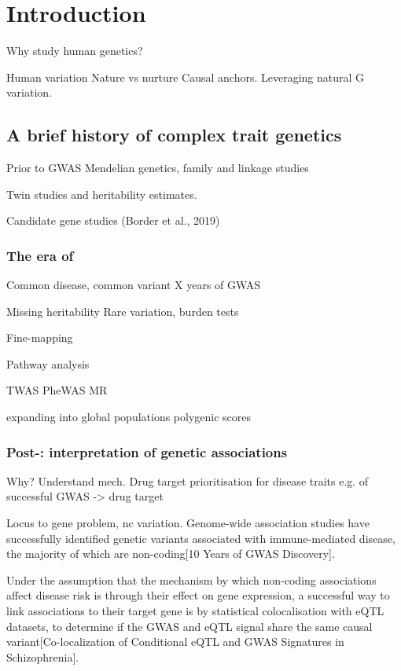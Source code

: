 %
%

\chapter{Introduction}

Why study human genetics?

Human variation
Nature vs nurture
Causal anchors.
Leveraging natural G variation.

\section{A brief history of complex trait genetics}

Prior to GWAS
Mendelian genetics, family and linkage studies

Twin studies and heritability estimates.

Candidate gene studies (Border et al., 2019)

\subsection{The era of }

Common disease, common variant
X years of GWAS

Missing heritability
Rare variation, burden tests

Fine-mapping

Pathway analysis

TWAS
PheWAS\autocite{verma2017CurrentScopeChallenges}
MR

expanding into global populations
polygenic scores

\subsection{Post-: interpretation of genetic associations}

Why?
Understand mech.
Drug target prioritisation for disease traits
e.g. of successful GWAS -> drug target

Locus to gene problem, nc variation.
Genome-wide association studies have successfully identified genetic variants associated with immune-mediated disease, the majority of which are non-coding[10 Years of GWAS Discovery].

Under the assumption that the mechanism by which non-coding associations affect disease risk is through their effect on gene expression, a successful way to link associations to their target gene is by statistical colocalisation with eQTL datasets, to determine if the GWAS and eQTL signal share the same causal variant[Co-localization of Conditional eQTL and GWAS Signatures in Schizophrenia].

